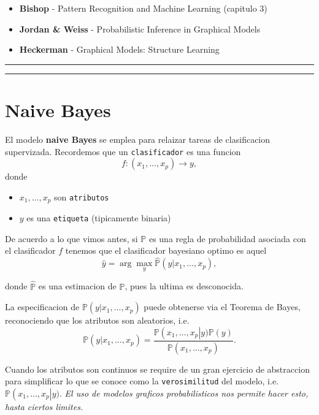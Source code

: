 \documentclass[11pt,]{article}
\begin{document}
\begin{itemize}
\item
  \textbf{Bishop} - Pattern Recognition and Machine Learning (capitulo
  3)
\item
  \textbf{Jordan \& Weiss} - Probabilistic Inference in Graphical Models
\item
  \textbf{Heckerman} - Graphical Models: Structure Learning
\end{itemize}

\begin{center}\rule{0.5\linewidth}{\linethickness}\end{center}

\begin{center}\rule{0.5\linewidth}{\linethickness}\end{center}

\section{Naive Bayes}\label{naive-bayes}

El modelo \textbf{naive Bayes} se emplea para relaizar tareas de
clasificacion supervizada. Recordemos que un \texttt{clasificador} es
una funcion \[f:(x_1,\ldots,x_p) \rightarrow y,\] donde

\begin{itemize}
\item
  \(x_1,\ldots,x_p\) son \texttt{atributos}
\item
  \(y\) es una \texttt{etiqueta} (tipicamente binaria)
\end{itemize}

De acuerdo a lo que vimos antes, si \(\mathbb{P}\) es una regla de
probabilidad asociada con el clasificador \(f\) tenemos que el
clasificador bayesiano optimo es aquel
\[\hat{y}=\arg\max_{y}\widehat{\mathbb{P}}\left(y|x_1,\ldots,x_p\right),\]

donde \(\widehat{\mathbb{P}}\) es una estimacion de \(\mathbb{P}\), pues
la ultima es desconocida.

La especificacion de \(\mathbb{P}\left(y|x_1,\ldots,x_p\right)\) puede
obtenerse via el Teorema de Bayes, reconociendo que los atributos son
aleatorios, i.e. \[
\mathbb{P}\left(y|x_1,\ldots,x_p\right)
= \frac{ \mathbb{P}\left(x_1,\ldots,x_p\right|y) \mathbb{P}(y) }{ \mathbb{P}\left(x_1,\ldots,x_p\right) }.
\]

Cuando los atributos son continuos se require de un gran ejercicio de
abstraccion para simplificar lo que se conoce como la
\texttt{verosimilitud} del modelo, i.e.
\(\mathbb{P}\left(x_1,\ldots,x_p\right|y)\). \emph{El uso de modelos
graficos probabilisticos nos permite hacer esto, hasta ciertos limites.}
\end{document}

